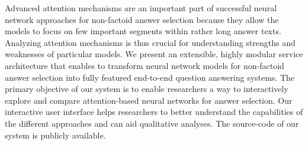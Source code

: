 Advanced attention mechanisms are an important part of successful neural network approaches for non-factoid answer selection because they allow the models to focus on few important segments within rather long answer texts. Analyzing attention mechanisms is thus crucial for understanding strengths and weaknesses of particular models. We present an extensible, highly modular service architecture that enables to transform neural network models for non-factoid answer selection into fully featured end-to-end question answering systems. The primary objective of our system is to enable researchers a way to interactively explore and compare attention-based neural networks for answer selection. Our interactive user interface helps researchers to better understand the capabilities of the different approaches and can aid qualitative analyses. The source-code of our system is publicly available.
